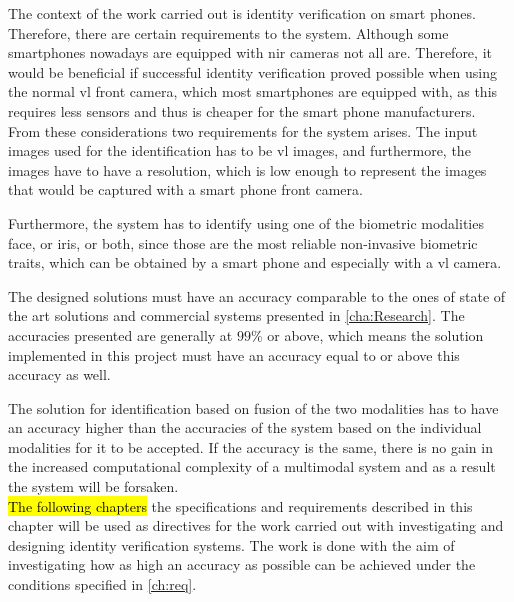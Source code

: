 The context of the work carried out is identity verification on smart phones. Therefore, there are certain requirements to the system. Although some smartphones nowadays are equipped with \gls{nir} cameras not all are. Therefore, it would be beneficial if successful identity verification proved possible when using the normal \gls{vl} front camera, which most smartphones are equipped with, as this requires less sensors and thus is cheaper for the smart phone manufacturers. From these considerations two requirements for the system arises. The input images used for the identification has to be \gls{vl} images, and furthermore, the images have to have a resolution, which is low enough to represent the images that would be captured with a smart phone front camera.

Furthermore, the system has to identify using one of the biometric modalities face, or iris, or both, since those are the most reliable non-invasive biometric traits, which can be obtained by a smart phone and especially with a \gls{vl} camera. 

The designed solutions must have an accuracy comparable to the ones of state of the art solutions and commercial systems presented in \autoref{cha:Research}. The accuracies presented are generally at $99\%$ or above, which means the solution implemented in this project must have an accuracy equal to or above this accuracy as well. 

The solution for identification based on fusion of the two modalities has to have an accuracy higher than the accuracies of the system based on the individual modalities for it to be accepted. If the accuracy is the same, there is no gain in the increased computational complexity of a multimodal system and as a result the system will be forsaken.\\

\hl{The following chapters} the specifications and requirements described in this chapter will be used as directives for the work carried out with investigating and designing identity verification systems. The work is done with the aim of investigating how as high an accuracy as possible  can be achieved under the conditions specified in \autoref{ch:req}. 

